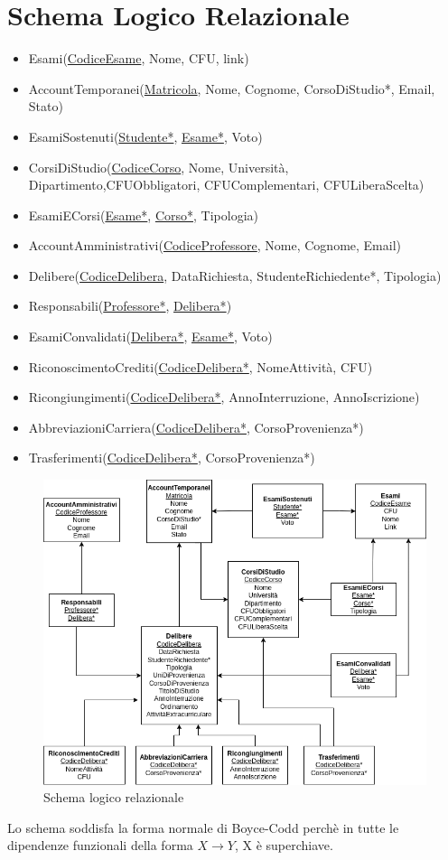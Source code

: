 \section{Schema Logico Relazionale}

\begin{itemize}
	\item Esami(\underline{CodiceEsame}, Nome, CFU, link)
	\item AccountTemporanei(\underline{Matricola}, Nome,
	      Cognome, CorsoDiStudio*, Email, Stato)
	\item EsamiSostenuti(\underline{Studente*},
	      \underline{Esame*}, Voto)
	\item CorsiDiStudio(\underline{CodiceCorso}, Nome,
	      Università, Dipartimento,CFUObbligatori,
	      CFUComplementari, CFULiberaScelta)
	\item EsamiECorsi(\underline{Esame*}, \underline{Corso*},
	      Tipologia)
	\item AccountAmministrativi(\underline{CodiceProfessore},
	      Nome, Cognome, Email)
	\item Delibere(\underline{CodiceDelibera}, DataRichiesta,
	      StudenteRichiedente*, Tipologia)
	\item Responsabili(\underline{Professore*},
	      \underline{Delibera*})
	\item EsamiConvalidati(\underline{Delibera*},
	      \underline{Esame*}, Voto)
	\item RiconoscimentoCrediti(\underline{CodiceDelibera*},
	      NomeAttività, CFU)
	\item Ricongiungimenti(\underline{CodiceDelibera*},
	      AnnoInterruzione, AnnoIscrizione)
	\item AbbreviazioniCarriera(\underline{CodiceDelibera*},
	      CorsoProvenienza*)
	\item Trasferimenti(\underline{CodiceDelibera*},
	      CorsoProvenienza*)
\end{itemize}

\begin{figure}[H]
	\centering
	\includegraphics[width=\textwidth]{relazionale.png}
	\caption{Schema logico relazionale}
	\label{Schema logico relazionale}
\end{figure}

Lo schema soddisfa la forma normale di Boyce-Codd perchè in
tutte le dipendenze funzionali della forma \(X \rightarrow Y\),
X è superchiave.


